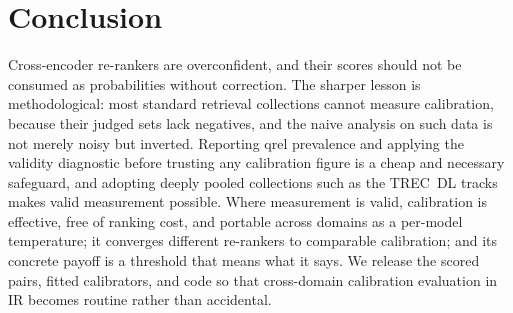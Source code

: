 \documentclass[sigconf,nonacm]{acmart}
\begin{document}
\section{Conclusion}\label{sec:conclusion}

Cross-encoder re-rankers are overconfident, and their scores should not be consumed as
probabilities without correction. The sharper lesson is methodological: most standard
retrieval collections cannot measure calibration, because their judged sets lack
negatives, and the naive analysis on such data is not merely noisy but inverted.
Reporting qrel prevalence and applying the validity diagnostic before trusting any
calibration figure is a cheap and necessary safeguard, and adopting deeply pooled
collections such as the TREC~DL tracks makes valid measurement possible. Where
measurement is valid, calibration is effective, free of ranking cost, and portable
across domains as a per-model temperature; it converges different re-rankers to
comparable calibration; and its concrete payoff is a threshold that means what it
says. We release the scored pairs, fitted calibrators, and code so that cross-domain
calibration evaluation in IR becomes routine rather than accidental.

\balance


\end{document}
